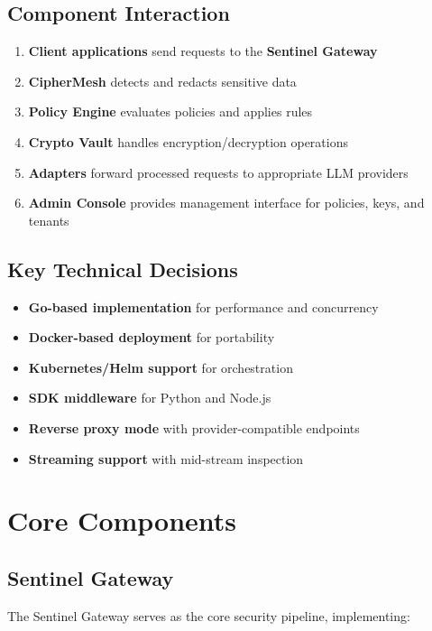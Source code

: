 \documentclass[12pt]{article}
\begin{document}
\subsection{Component Interaction}

\begin{enumerate}
    \item \textbf{Client applications} send requests to the \textbf{Sentinel Gateway}
    \item \textbf{CipherMesh} detects and redacts sensitive data
    \item \textbf{Policy Engine} evaluates policies and applies rules
    \item \textbf{Crypto Vault} handles encryption/decryption operations
    \item \textbf{Adapters} forward processed requests to appropriate LLM providers
    \item \textbf{Admin Console} provides management interface for policies, keys, and tenants
\end{enumerate}

\subsection{Key Technical Decisions}

\begin{itemize}
    \item \textbf{Go-based implementation} for performance and concurrency
    \item \textbf{Docker-based deployment} for portability
    \item \textbf{Kubernetes/Helm support} for orchestration
    \item \textbf{SDK middleware} for Python and Node.js
    \item \textbf{Reverse proxy mode} with provider-compatible endpoints
    \item \textbf{Streaming support} with mid-stream inspection
\end{itemize}

\section{Core Components}

\subsection{Sentinel Gateway}

The Sentinel Gateway serves as the core security pipeline, implementing:
\end{document}
